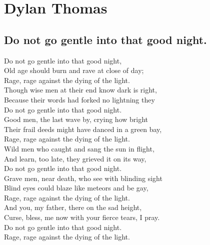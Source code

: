 \chapter{Dylan Thomas}
\section{Do not go gentle into that good night.}

Do not go gentle into that good night,\\
Old age should burn and rave at close of day;\\
Rage, rage against the dying of the light.\\

Though wise men at their end know dark is right,\\
Because their words had forked no lightning they\\
Do not go gentle into that good night.\\

Good men, the last wave by, crying how bright\\
Their frail deeds might have danced in a green bay,\\
Rage, rage against the dying of the light.\\

Wild men who caught and sang the sun in flight,\\
And learn, too late, they grieved it on its way,\\
Do not go gentle into that good night.\\

Grave men, near death, who see with blinding sight\\
Blind eyes could blaze like meteors and be gay,\\
Rage, rage against the dying of the light.\\

And you, my father, there on the sad height,\\
Curse, bless, me now with your fierce tears, I pray.\\
Do not go gentle into that good night.\\
Rage, rage against the dying of the light.